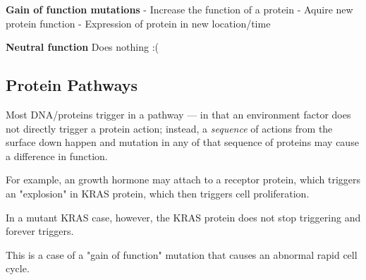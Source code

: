 \documentclass[letterpaper]{article}
\begin{document}
\textbf{Gain of function mutations} - Increase the function of a protein -
Aquire new protein function - Expression of protein in new location/time

\textbf{Neutral function} Does nothing :(

\subsection{Protein Pathways}
\label{sec:orgc991414}
Most DNA/proteins trigger in a pathway --- in that an environment factor
does not directly trigger a protein action; instead, a \emph{sequence} of
actions from the surface down happen and mutation in any of that
sequence of proteins may cause a difference in function.

For example, an growth hormone may attach to a receptor protein, which
triggers an "explosion" in KRAS protein, which then triggers cell
proliferation.

In a mutant KRAS case, however, the KRAS protein does not stop
triggering and forever triggers.

This is a case of a "gain of function" mutation that causes an abnormal
rapid cell cycle.
\end{document}
